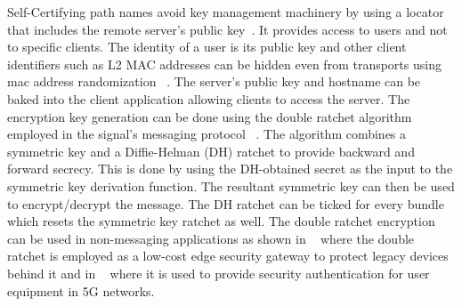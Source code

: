 Self-Certifying path names avoid key management machinery by using a locator that includes the remote server’s public key~\cite{rw16}. It provides access to users and not to specific clients. The identity of a user is its public key and other client identifiers such as L2 MAC addresses can be hidden even from transports using mac address randomization ~\cite{rw17}. The server’s public key and hostname can be baked into the client application allowing clients to access the server. The encryption key generation can be done using the double ratchet algorithm employed in the signal’s messaging protocol ~\cite{rw18}. The algorithm combines a symmetric key and a Diffie-Helman (DH) ratchet to provide backward and forward secrecy. This is done by using the DH-obtained secret as the input to the symmetric key derivation function. The resultant symmetric key can then be used to encrypt/decrypt the message. The DH ratchet can be ticked for every bundle which resets the symmetric key ratchet as well. The double ratchet encryption can be used in non-messaging applications as shown in ~\cite{rw19} where the double ratchet is employed as a low-cost edge security gateway to protect legacy devices behind it and in ~\cite{rw20} where it is used to provide security authentication for user equipment in 5G networks.

